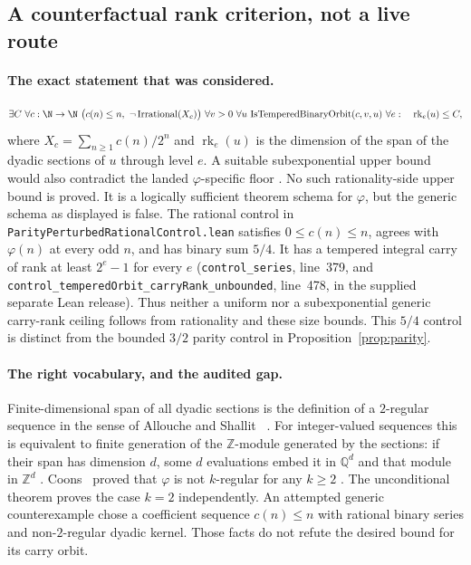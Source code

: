 \subsection{A counterfactual rank criterion, not a live route}

\paragraph{The exact statement that was considered.}
\[
  \exists C\ \forall c:\N\to\N\ \bigl(c(n)\le n,\ \neg\,\mathrm{Irrational}(X_c)\bigr)
  \ \forall v>0\ \forall u\ \mathrm{IsTemperedBinaryOrbit}(c,v,u)\ \forall e:\quad
  \operatorname{rk}_e(u)\le C ,
\]
where $X_c=\sum_{n\ge1}c(n)/2^{n}$ and $\operatorname{rk}_e(u)$ is the
dimension of the span of the dyadic sections of $u$ through level $e$.
A suitable subexponential upper bound would also contradict the landed
$\varphi$-specific floor
\quad {}.  No such rationality-side upper bound is proved.  It is a
logically sufficient theorem schema for $\varphi$, but the generic schema
as displayed is false. The rational control in
\texttt{ParityPerturbedRationalControl.lean} satisfies $0\le c(n)\le n$,
agrees with $\varphi(n)$ at every odd $n$, and has binary sum $5/4$.
It has a tempered integral carry of rank at least $2^e-1$ for every $e$
(\texttt{control\_series}, line~379, and
\texttt{control\_temperedOrbit\_carryRank\_unbounded}, line~478, in the
supplied separate Lean release). Thus neither a uniform nor a subexponential
generic carry-rank ceiling follows from rationality and these size bounds.
This $5/4$ control is distinct from the bounded $3/2$ parity control in
Proposition~\ref{prop:parity}.

\paragraph{The right vocabulary, and the audited gap.}
Finite-dimensional span of all dyadic sections is the definition of a
$2$-regular sequence in the sense of Allouche and
Shallit~\cite[Definition~2.1]{allouche-shallit} .  For
integer-valued sequences this is equivalent to finite generation of the
$\mathbb Z$-module generated by the sections: if their span has dimension $d$,
some $d$ evaluations embed it in $\mathbb Q^d$ and that module in
$\mathbb Z^d$ .
Coons~\cite[Theorem~3.2]{coons} proved that
$\varphi$ is not $k$-regular for any $k\ge2$ .  The
unconditional theorem
proves the case $k=2$ independently.  An attempted generic counterexample
chose a coefficient sequence $c(n)\le n$ with rational binary series and
non-$2$-regular dyadic kernel.  Those facts do not refute the desired bound
for its carry orbit.

